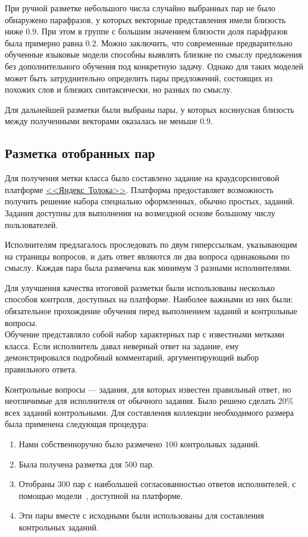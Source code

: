 \documentclass[a4paper,14pt]{extarticle}
\begin{document}
При ручной разметке небольшого числа случайно выбранных пар не было обнаружено парафразов, у которых векторные представления имели близость ниже $0.9$.
При этом в группе с большим значением близости доля парафразов была примерно равна $0.2$.
Можно заключить, что современные предварительно обученные языковые модели способны выявлять близкие по смыслу предложения без дополнительного обучения под конкретную задачу.
Однако для таких моделей может быть затруднительно определить пары предложений, состоящих из похожих слов и близких синтаксически, но разных по смыслу.

Для дальнейшей разметки были выбраны пары, у которых косинусная близость между полученными векторами оказалась не меньше $0.9$.

\subsection{Разметка отобранных пар}
Для получения метки класса было составлено задание на краудсорсинговой платформе \href{https://toloka.yandex.ru/}{\mbox{<<Яндекс Толока>>}}.
Платформа предоставляет возможность получить решение набора специально оформленных, обычно простых, заданий.
Задания доступны для выполнения на возмездной основе большому числу пользователей.

Исполнителям предлагалось проследовать по двум гиперссылкам, указывающим на страницы вопросов, и дать ответ являются ли два вопроса одинаковыми по смыслу.
Каждая пара была размечена как минимум $3$ разными исполнителями.

Для улучшения качества итоговой разметки были использованы несколько способов контроля, доступных на платформе.
Наиболее важными из них были: обязательное прохождение обучения перед выполнением заданий и контрольные вопросы.\\
Обучение представляло собой набор характерных пар с известными метками класса.
Если исполнитель давал неверный ответ на задание, ему демонстрировался подробный комментарий, аргументирующий выбор правильного ответа.

Контрольные вопросы — задания, для которых известен правильный ответ, но неотличимые для исполнителя от обычного задания.
Было решено сделать $20\%$ всех заданий контрольными.
Для составления коллекции необходимого размера была применена следующая процедура:
\begin{enumerate}
    \item Нами собственноручно было размечено $100$ контрольных заданий.
    \item Была получена разметка для $500$ пар.
    \item Отобраны $300$ пар с наибольшей согласованностью ответов исполнителей, с помощью модели~\autocite{dawid1979maximum}, доступной на платформе.
    \item Эти пары вместе с исходными были использованы для составления контрольных заданий. 
\end{enumerate}
\end{document}
